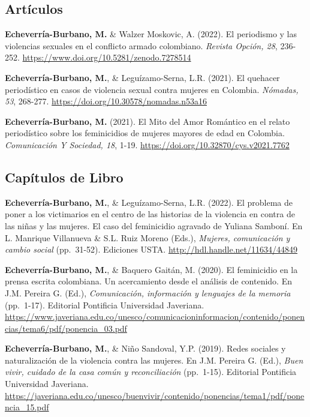 \documentclass[11pt,a4paper,]{awesome-cv}
\begin{document}
\hypertarget{section}{%
\subsection{\texorpdfstring{\textbf{Artículos}}{}}\label{section}}

\begingroup
\setlength{\parindent}{-0.5in}
\setlength{\leftskip}{0.5in}

\textbf{Echeverría-Burbano, M.} \& Walzer Moskovic, A. (2022). El
periodismo y las violencias sexuales en el conflicto armado colombiano.
\emph{Revista Opción, 28}, 236-252.
\url{https://www.doi.org/10.5281/zenodo.7278514}

\textbf{Echeverría-Burbano, M.}, \& Leguízamo-Serna, L.R. (2021). El
quehacer periodístico en casos de violencia sexual contra mujeres en
Colombia. \emph{Nómadas, 53}, 268-277.
\url{https://doi.org/10.30578/nomadas.n53a16}

\textbf{Echeverría-Burbano, M.} (2021). El Mito del Amor Romántico en el
relato periodístico sobre los feminicidios de mujeres mayores de edad en
Colombia. \emph{Comunicación Y Sociedad, 18}, 1-19.
\url{https://doi.org/10.32870/cys.v2021.7762}

\endgroup

\hypertarget{section-1}{%
\subsection{\texorpdfstring{\textbf{Capítulos de Libro}}{}}\label{section-1}}

\begingroup
\setlength{\parindent}{-0.5in}
\setlength{\leftskip}{0.5in}

\textbf{Echeverría-Burbano, M.}, \& Leguízamo-Serna, L.R. (2022). El
problema de poner a los victimarios en el centro de las historias de la
violencia en contra de las niñas y las mujeres. El caso del feminicidio
agravado de Yuliana Samboní. En L. Manrique Villanueva \& S.L. Ruiz
Moreno (Eds.), \emph{Mujeres, comunicación y cambio social} (pp.~31-52).
Ediciones USTA. \url{http://hdl.handle.net/11634/44849}

\textbf{Echeverría-Burbano, M.}, \& Baquero Gaitán, M. (2020). El
feminicidio en la prensa escrita colombiana. Un acercamiento desde el
análisis de contenido. En J.M. Pereira G. (Ed.), \emph{Comunicación,
información y lenguajes de la memoria} (pp.~1-17). Editorial Pontificia
Universidad Javeriana.
\url{https://www.javeriana.edu.co/unesco/comunicacioninformacion/contenido/ponencias/tema6/pdf/ponencia_03.pdf}

\textbf{Echeverría-Burbano, M.}, \& Niño Sandoval, Y.P. (2019). Redes
sociales y naturalización de la violencia contra las mujeres. En J.M.
Pereira G. (Ed.), \emph{Buen vivir, cuidado de la casa común y
reconciliación} (pp.~1-15). Editorial Pontificia Universidad Javeriana.
\url{https://javeriana.edu.co/unesco/buenvivir/contenido/ponencias/tema1/pdf/ponencia_15.pdf}
\end{document}
